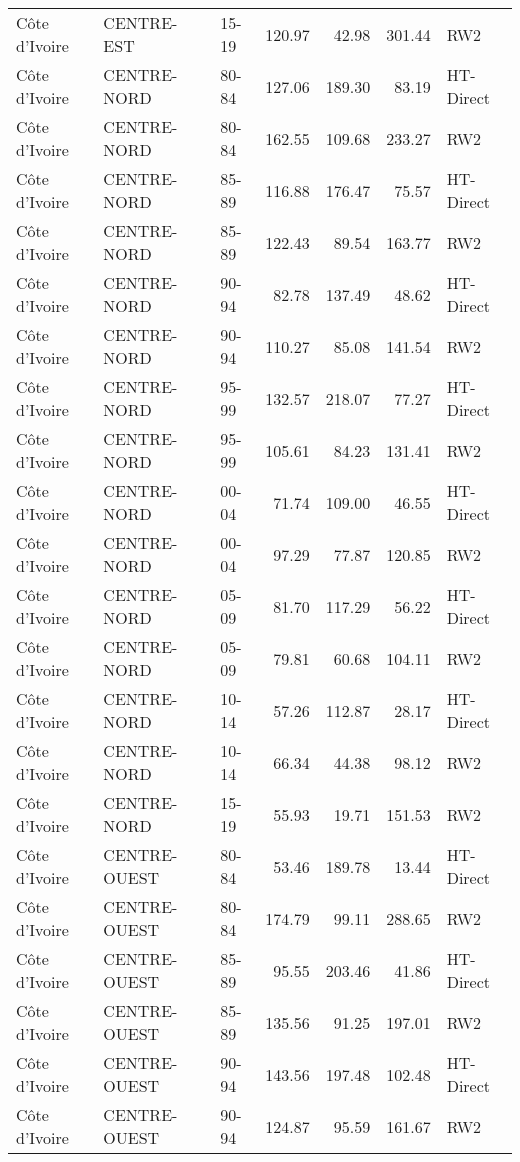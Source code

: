 \begin{longtable}{lllrrrl}
  C\^{o}te d'Ivoire & CENTRE-EST & 15-19 & 120.97 & 42.98 & 301.44 & RW2 \\ 
  C\^{o}te d'Ivoire & CENTRE-NORD & 80-84 & 127.06 & 189.30 & 83.19 & HT-Direct \\ 
  C\^{o}te d'Ivoire & CENTRE-NORD & 80-84 & 162.55 & 109.68 & 233.27 & RW2 \\ 
  C\^{o}te d'Ivoire & CENTRE-NORD & 85-89 & 116.88 & 176.47 & 75.57 & HT-Direct \\ 
  C\^{o}te d'Ivoire & CENTRE-NORD & 85-89 & 122.43 & 89.54 & 163.77 & RW2 \\ 
  C\^{o}te d'Ivoire & CENTRE-NORD & 90-94 & 82.78 & 137.49 & 48.62 & HT-Direct \\ 
  C\^{o}te d'Ivoire & CENTRE-NORD & 90-94 & 110.27 & 85.08 & 141.54 & RW2 \\ 
  C\^{o}te d'Ivoire & CENTRE-NORD & 95-99 & 132.57 & 218.07 & 77.27 & HT-Direct \\ 
  C\^{o}te d'Ivoire & CENTRE-NORD & 95-99 & 105.61 & 84.23 & 131.41 & RW2 \\ 
  C\^{o}te d'Ivoire & CENTRE-NORD & 00-04 & 71.74 & 109.00 & 46.55 & HT-Direct \\ 
  C\^{o}te d'Ivoire & CENTRE-NORD & 00-04 & 97.29 & 77.87 & 120.85 & RW2 \\ 
  C\^{o}te d'Ivoire & CENTRE-NORD & 05-09 & 81.70 & 117.29 & 56.22 & HT-Direct \\ 
  C\^{o}te d'Ivoire & CENTRE-NORD & 05-09 & 79.81 & 60.68 & 104.11 & RW2 \\ 
  C\^{o}te d'Ivoire & CENTRE-NORD & 10-14 & 57.26 & 112.87 & 28.17 & HT-Direct \\ 
  C\^{o}te d'Ivoire & CENTRE-NORD & 10-14 & 66.34 & 44.38 & 98.12 & RW2 \\ 
  C\^{o}te d'Ivoire & CENTRE-NORD & 15-19 & 55.93 & 19.71 & 151.53 & RW2 \\ 
  C\^{o}te d'Ivoire & CENTRE-OUEST & 80-84 & 53.46 & 189.78 & 13.44 & HT-Direct \\ 
  C\^{o}te d'Ivoire & CENTRE-OUEST & 80-84 & 174.79 & 99.11 & 288.65 & RW2 \\ 
  C\^{o}te d'Ivoire & CENTRE-OUEST & 85-89 & 95.55 & 203.46 & 41.86 & HT-Direct \\ 
  C\^{o}te d'Ivoire & CENTRE-OUEST & 85-89 & 135.56 & 91.25 & 197.01 & RW2 \\ 
  C\^{o}te d'Ivoire & CENTRE-OUEST & 90-94 & 143.56 & 197.48 & 102.48 & HT-Direct \\ 
  C\^{o}te d'Ivoire & CENTRE-OUEST & 90-94 & 124.87 & 95.59 & 161.67 & RW2 \\ 

\end{longtable}
